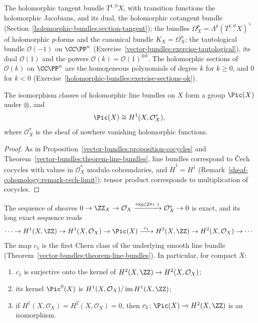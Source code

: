 \begin{example}\label{holomorphic-bundles:example-bundles}
The holomorphic tangent bundle $T^{1,0}X$, with transition functions the holomorphic Jacobians, and its dual, the holomorphic cotangent bundle
(Section~\ref{holomorphic-bundles:section-tangent}); the bundles $\Omega^p_X = \Lambda^p(T^{1,0}X)^\vee$ of holomorphic $p$-forms and the canonical bundle
$K_X = \Omega^n_X$; the tautological bundle $\mathcal{O}(-1)$ on $\CC\PP^n$ (Exercise~\ref{vector-bundles:exercise-tautological}), its dual $\mathcal{O}(1)$ and the powers
$\mathcal{O}(k) = \mathcal{O}(1)^{\otimes k}$. The holomorphic sections of $\mathcal{O}(k)$ on $\CC\PP^n$ are the homogeneous polynomials of degree $k$ for $k \geq 0$, and $0$ for $k < 0$
(Exercise~\ref{holomorphic-bundles:exercise-sections-ok}).
\end{example}

\begin{proposition}\label{holomorphic-bundles:proposition-picard}
The isomorphism classes of holomorphic line bundles on $X$ form a group $\Pic(X)$ under $\otimes$, and
\[
\Pic(X) \cong H^1(X, \mathcal{O}_X^*),
\]
where $\mathcal{O}_X^*$ is the sheaf of nowhere vanishing holomorphic functions.
\end{proposition}

\begin{proof}
As in Proposition~\ref{vector-bundles:proposition-cocycles} and Theorem~\ref{vector-bundles:theorem-line-bundles}, line bundles correspond to \v{C}ech cocycles with values in $\mathcal{O}_X^*$ modulo
coboundaries, and $\check{H}^1 = H^1$ (Remark~\ref{sheaf-cohomology:remark-cech-limit}); tensor product corresponds to multiplication of cocycles.
\end{proof}

\begin{theorem}\label{holomorphic-bundles:theorem-exponential}
The sequence of sheaves $0 \to \ZZ_X \to \mathcal{O}_X \xrightarrow{\exp(2\pi i\,\cdot)} \mathcal{O}_X^* \to 0$ is exact, and its long exact sequence reads
\[
\cdots \to H^1(X, \ZZ) \to H^1(X, \mathcal{O}_X) \to \Pic(X) \xrightarrow{\ c_1\ } H^2(X, \ZZ) \to H^2(X, \mathcal{O}_X) \to \cdots
\]
The map $c_1$ is the first Chern class of the underlying smooth line bundle (Theorem~\ref{vector-bundles:theorem-line-bundles}). In particular, for compact $X$:
\begin{enumerate}
\item $c_1$ is surjective onto the kernel of $H^2(X, \ZZ) \to H^2(X, \mathcal{O}_X)$;
\item its kernel $\Pic^0(X)$ is $H^1(X, \mathcal{O}_X)/\operatorname{im}H^1(X, \ZZ)$;
\item if $H^1(X, \mathcal{O}_X) = H^2(X, \mathcal{O}_X) = 0$, then $c_1 \colon \Pic(X) \to H^2(X, \ZZ)$ is an isomorphism.
\end{enumerate}
\end{theorem}

